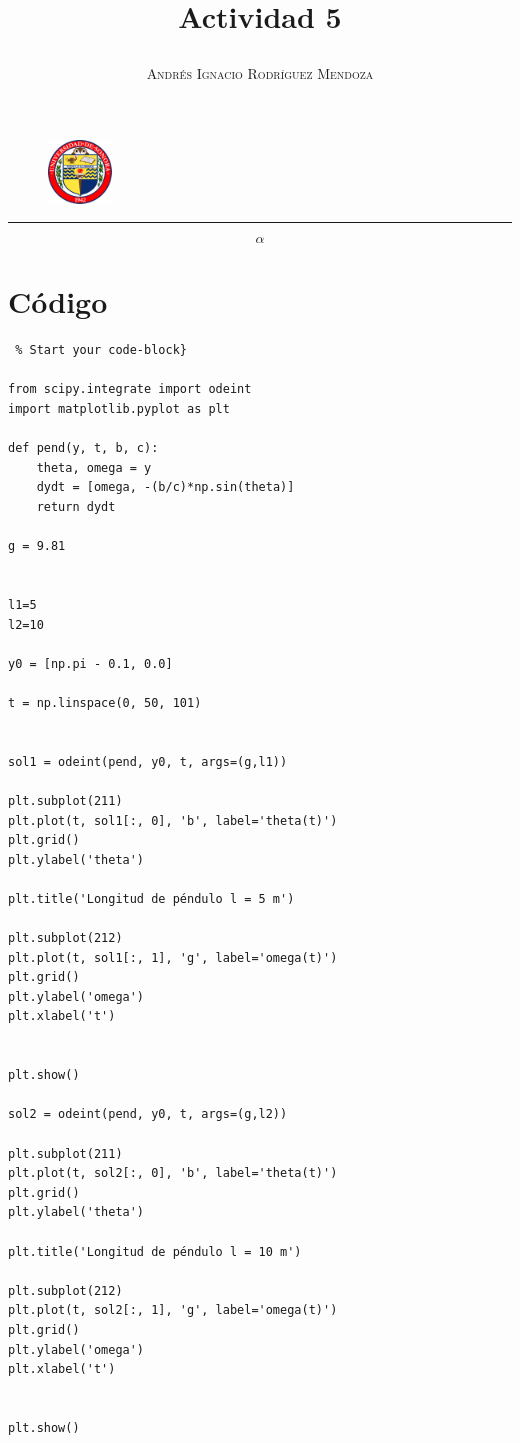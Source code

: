 \documentclass[11pt,spanish]{article}
\title{\vspace{-3cm}\begin{flushleft}\textbf{Actividad 5}\end{flushleft}}
\author{\hspace{-9.6cm}\textsc{Andrés Ignacio Rodríguez Mendoza}}
\date{}
\begin{document}
\begin{figure}
  \begin{center}
   \vspace{-5.4cm} \includegraphics[width=0.15\textwidth]{uni}
  \end{center}
\end{figure}

\maketitle  
\begin{center}
\rule{\textwidth}{1pt}
\end{center}

$$\alpha$$

\section*{Código}

\begin{lstlisting} % Start your code-block}

from scipy.integrate import odeint
import matplotlib.pyplot as plt

def pend(y, t, b, c):
    theta, omega = y
    dydt = [omega, -(b/c)*np.sin(theta)]
    return dydt

g = 9.81


l1=5
l2=10

y0 = [np.pi - 0.1, 0.0]

t = np.linspace(0, 50, 101)


sol1 = odeint(pend, y0, t, args=(g,l1))

plt.subplot(211)
plt.plot(t, sol1[:, 0], 'b', label='theta(t)')
plt.grid()
plt.ylabel('theta')

plt.title('Longitud de péndulo l = 5 m')

plt.subplot(212)
plt.plot(t, sol1[:, 1], 'g', label='omega(t)')
plt.grid()
plt.ylabel('omega')
plt.xlabel('t')


plt.show()

sol2 = odeint(pend, y0, t, args=(g,l2))

plt.subplot(211)
plt.plot(t, sol2[:, 0], 'b', label='theta(t)')
plt.grid()
plt.ylabel('theta')

plt.title('Longitud de péndulo l = 10 m')

plt.subplot(212)
plt.plot(t, sol2[:, 1], 'g', label='omega(t)')
plt.grid()
plt.ylabel('omega')
plt.xlabel('t')


plt.show()
\end{lstlisting}
\end{document}
